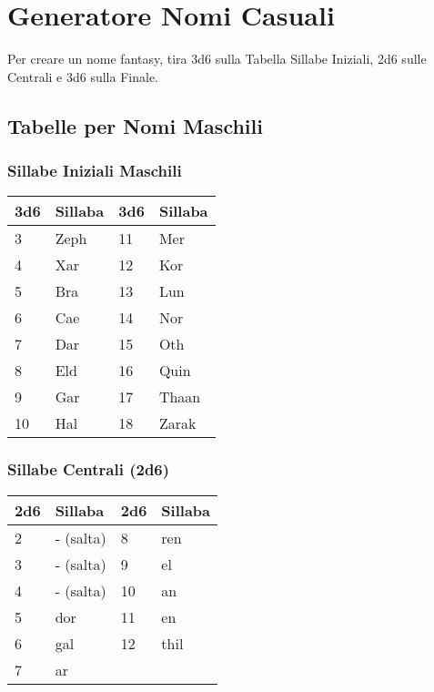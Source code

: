 \section{Generatore Nomi Casuali}

\begin{multicols}{2}

Per creare un nome fantasy, tira 3d6 sulla Tabella Sillabe Iniziali, 2d6 sulle Centrali e 3d6 sulla Finale.

{\small

\subsection*{Tabelle per Nomi Maschili}

\subsubsection*{Sillabe Iniziali Maschili}
\noindent\begin{tabularx}{\linewidth}{X|l|X|l}
	\toprule
\textbf{3d6} & \textbf{Sillaba} & \textbf{3d6} & \textbf{Sillaba} \\
\toprule
3 & Zeph & 11 & Mer \\
4 & Xar & 12 & Kor \\
5 & Bra &    13 & Lun      \\
6 & Cae & 14 & Nor     \\
7 & Dar & 15 & Oth      \\
8 & Eld &  16 & Quin \\
9 & Gar  & 17 & Thaan \\
10 & Hal &  18 & Zarak  \\
\end{tabularx}


\subsubsection*{Sillabe Centrali (2d6)}
\noindent\begin{tabularx}{\linewidth}{X|l|X|l}
	\toprule
\textbf{2d6} & \textbf{Sillaba} & \textbf{2d6} & \textbf{Sillaba} \\
\toprule
2 & - (salta) & 8 & ren \\
3 & - (salta) & 9 & el \\
4 & - (salta) & 10 & an \\
5 & dor & 11 & en \\
6 & gal & 12 & thil \\
7 & ar & & \\
\end{tabularx}


}
\end{multicols}
